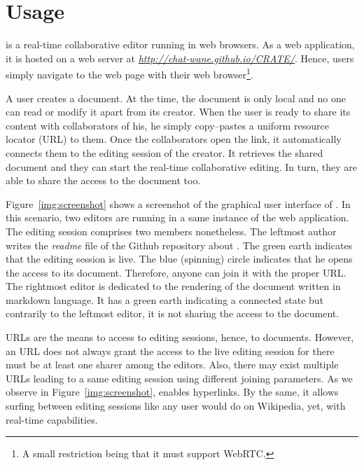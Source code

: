 
\section{Usage}

\CRATE is a real-time collaborative editor running in web browsers. As a web
application, it is hosted on a web server at
\emph{\url{http://chat-wane.github.io/CRATE/}}. Hence, users simply navigate to
the web page with their web browser\footnote{A small restriction being that it
  must support WebRTC.}.

A user creates a document. At the time, the document is only local and no one
can read or modify it apart from its creator. When the user is ready to share
its content with collaborators of his, he simply copy--pastes a uniform resource
locator (URL) to them. Once the collaborators open the link, it automatically
connects them to the editing session of the creator. It retrieves the shared
document and they can start the real-time collaborative editing. In turn, they
are able to share the access to the document too.


Figure~\ref{img:screenshot} shows a screenshot of the graphical user interface
of \CRATE. In this scenario, two editors are running in a same instance of the
web application. The editing session comprises two members nonetheless. The
leftmost author writes the \emph{readme} file of the Github repository about
\CRATE. The green earth indicates that the editing session is live. The blue
(spinning) circle indicates that he opens the access to its document. Therefore,
anyone can join it with the proper URL. The rightmost editor is dedicated to the
rendering of the document written in markdown language. It has a green earth
indicating a connected state but contrarily to the leftmost editor, it is not
sharing the access to the document.

URLs are the means to access to editing sessions, hence, to documents. However,
an URL does not always grant the access to the live editing session for there
must be at least one sharer among the editors. Also, there may exist multiple
URLs leading to a same editing session using different joining parameters. As we
observe in Figure~\ref{img:screenshot}, \CRATE enables hyperlinks. By the same,
it allows surfing between editing sessions like any user would do on Wikipedia,
yet, with real-time capabilities.
